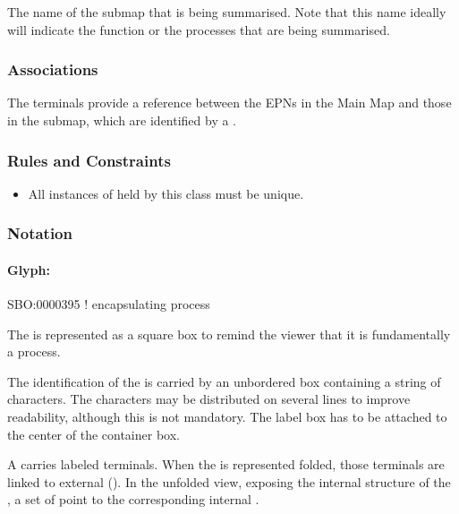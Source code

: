 \begin{attributes}
   The name of the submap that is being
  summarised. Note that this name ideally will indicate the function
  or the processes that are being summarised.
\end{attributes}

\subsubsection{Associations}

\begin{attributes}
 The terminals provide a
reference between the EPNs in the Main Map and those in the submap,
which are identified by a .
\end{attributes}

\subsubsection{Rules and Constraints}

\begin{itemize}
\item All instances of  held by this class
  must be unique.
\end{itemize}

\subsubsection{Notation}

\paragraph{Glyph: }

\begin{glyphDescription}

\glyphSboTerm SBO:0000395 ! encapsulating process

\glyphContainer The  is represented as a square box to remind the viewer that it is fundamentally a process.

\glyphLabel The identification of the  is carried by an unbordered box containing a string of characters.  The characters may be distributed on several lines to improve readability, although this is not mandatory.  The label box has to be attached to the center of the container box.

\glyphAux A  carries labeled terminals.  When the  is represented folded, those terminals are linked to external  ().  In the unfolded view, exposing the internal structure of the , a set of  point to the corresponding internal  .

\end{glyphDescription}


